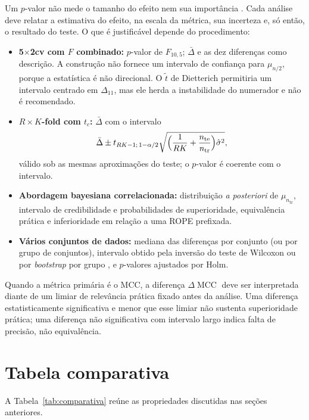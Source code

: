 \documentclass[11pt,a4paper]{article}
\newcommand{\tr}{\mathrm{tr}}
\newcommand{\te}{\mathrm{te}}
\newcommand{\MCC}{\operatorname{MCC}}
\begin{document}
Um $p$-valor não mede o tamanho do efeito nem sua importância
\citep{wasserstein2016asa}. Cada análise deve relatar a estimativa do efeito, na
escala da métrica, sua incerteza e, só então, o resultado do teste. O que é
justificável depende do procedimento:
\begin{itemize}[leftmargin=*]
  \item \textbf{5$\times$2cv com $F$ combinado:} $p$-valor de $F_{10,5}$;
    $\bar\Delta$ e as dez diferenças como descrição. A construção não fornece um
    intervalo de confiança para $\mu_{n/2}$, porque a estatística é não
    direcional. O $\tilde t$ de Dietterich permitiria um intervalo centrado em
    $\Delta_{11}$, mas ele herda a instabilidade do numerador e não é
    recomendado.
  \item \textbf{$R\times K$-fold com $t_c$:} $\bar\Delta$ com o intervalo
    \begin{equation}
      \bar\Delta\pm t_{RK-1;\,1-\alpha/2}\sqrt{\Bigl(\frac{1}{RK}+\frac{n_{\te}}{n_{\tr}}\Bigr)\hat\sigma^{2}},
      \label{eq:ic}
    \end{equation}
    válido sob as mesmas aproximações do teste; o $p$-valor é coerente com o
    intervalo.
  \item \textbf{Abordagem bayesiana correlacionada:} distribuição
    \emph{a posteriori} de $\mu_{n_{\tr}}$, intervalo de credibilidade e
    probabilidades de superioridade, equivalência prática e inferioridade em
    relação a uma ROPE prefixada.
  \item \textbf{Vários conjuntos de dados:} mediana das diferenças por
    conjunto (ou por grupo de conjuntos), intervalo obtido pela inversão do
    teste de Wilcoxon ou por \emph{bootstrap} por grupo
    \citep{field2007bootstrapping}, e $p$-valores ajustados por Holm.
\end{itemize}
Quando a métrica primária é o MCC, a diferença $\Delta\MCC$ deve ser
interpretada diante de um limiar de relevância prática fixado antes da
análise. Uma diferença estatisticamente significativa e menor que esse limiar
não sustenta superioridade prática; uma diferença não significativa com
intervalo largo indica falta de precisão, não equivalência.

\section{Tabela comparativa}\label{sec:tabela}

A Tabela~\ref{tab:comparativa} reúne as propriedades discutidas nas seções
anteriores.
\end{document}
